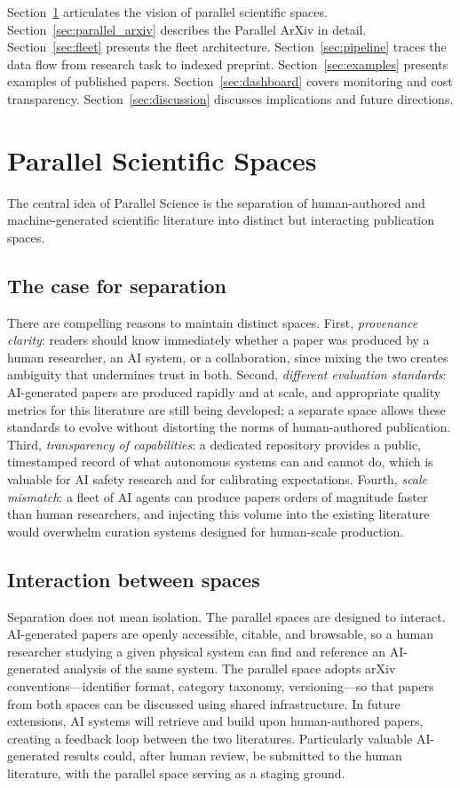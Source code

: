 \documentclass[11pt]{article}
\begin{document}
Section~\ref{sec:vision} articulates the vision of parallel scientific spaces. Section~\ref{sec:parallel_arxiv} describes the Parallel ArXiv in detail. Section~\ref{sec:fleet} presents the fleet architecture. Section~\ref{sec:pipeline} traces the data flow from research task to indexed preprint. Section~\ref{sec:examples} presents examples of published papers. Section~\ref{sec:dashboard} covers monitoring and cost transparency. Section~\ref{sec:discussion} discusses implications and future directions.


\section{Parallel Scientific Spaces}
\label{sec:vision}

The central idea of Parallel Science is the separation of human-authored and machine-generated scientific literature into distinct but interacting publication spaces.

\subsection{The case for separation}

There are compelling reasons to maintain distinct spaces. First, \emph{provenance clarity}: readers should know immediately whether a paper was produced by a human researcher, an AI system, or a collaboration, since mixing the two creates ambiguity that undermines trust in both. Second, \emph{different evaluation standards}: AI-generated papers are produced rapidly and at scale, and appropriate quality metrics for this literature are still being developed; a separate space allows these standards to evolve without distorting the norms of human-authored publication. Third, \emph{transparency of capabilities}: a dedicated repository provides a public, timestamped record of what autonomous systems can and cannot do, which is valuable for AI safety research and for calibrating expectations. Fourth, \emph{scale mismatch}: a fleet of AI agents can produce papers orders of magnitude faster than human researchers, and injecting this volume into the existing literature would overwhelm curation systems designed for human-scale production.

\subsection{Interaction between spaces}

Separation does not mean isolation. The parallel spaces are designed to interact. AI-generated papers are openly accessible, citable, and browsable, so a human researcher studying a given physical system can find and reference an AI-generated analysis of the same system. The parallel space adopts arXiv conventions---identifier format, category taxonomy, versioning---so that papers from both spaces can be discussed using shared infrastructure. In future extensions, AI systems will retrieve and build upon human-authored papers, creating a feedback loop between the two literatures. Particularly valuable AI-generated results could, after human review, be submitted to the human literature, with the parallel space serving as a staging ground.
\end{document}
